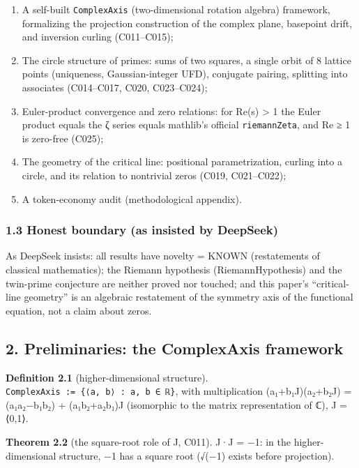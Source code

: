 \documentclass[
]{article}
\providecommand{\tightlist}{%
  \setlength{\itemsep}{0pt}\setlength{\parskip}{0pt}}
\begin{document}
\begin{enumerate}
\def\labelenumi{\arabic{enumi}.}
\tightlist
\item
  A self-built \texttt{ComplexAxis} (two-dimensional rotation algebra)
  framework, formalizing the projection construction of the complex
  plane, basepoint drift, and inversion curling (C011--C015);
\item
  The circle structure of primes: sums of two squares, a single orbit of
  8 lattice points (uniqueness, Gaussian-integer UFD), conjugate
  pairing, splitting into associates (C014--C017, C020, C023--C024);
\item
  Euler-product convergence and zero relations: for Re(s) \textgreater{}
  1 the Euler product equals the ζ series equals mathlib's official
  \texttt{riemannZeta}, and Re ≥ 1 is zero-free (C025);
\item
  The geometry of the critical line: positional parametrization, curling
  into a circle, and its relation to nontrivial zeros (C019,
  C021--C022);
\item
  A token-economy audit (methodological appendix).
\end{enumerate}

\subsubsection{1.3 Honest boundary (as insisted by
DeepSeek)}\label{honest-boundary-as-insisted-by-deepseek}

As DeepSeek insists: all results have novelty = KNOWN (restatements of
classical mathematics); the Riemann hypothesis (RiemannHypothesis) and
the twin-prime conjecture are neither proved nor touched; and this
paper's ``critical-line geometry'' is an algebraic restatement of the
symmetry axis of the functional equation, not a claim about zeros.

\subsection{2. Preliminaries: the ComplexAxis
framework}\label{preliminaries-the-complexaxis-framework}

\textbf{Definition 2.1} (higher-dimensional structure).
\texttt{ComplexAxis\ :=\ \{⟨a,\ b⟩\ :\ a,\ b\ ∈\ ℝ\}}, with
multiplication (a₁+b₁J)(a₂+b₂J) = (a₁a₂−b₁b₂) + (a₁b₂+a₂b₁)J (isomorphic
to the matrix representation of ℂ), J = ⟨0,1⟩.

\textbf{Theorem 2.2} (the square-root role of J, C011). J·J = −1: in the
higher-dimensional structure, −1 has a square root (√(−1) exists before
projection).
\end{document}
